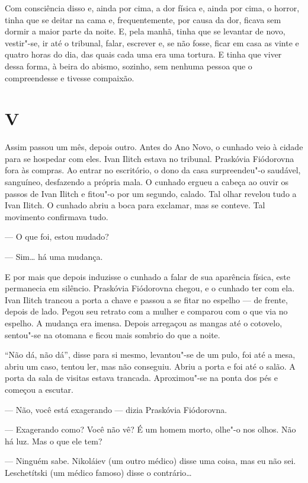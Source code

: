 Com consciência disso e, ainda por cima, a dor física e, ainda por cima,
o horror, tinha que se deitar na cama e, frequentemente, por causa da
dor, ficava sem dormir a maior parte da noite. E, pela manhã, tinha que
se levantar de novo, vestir"-se, ir até o tribunal, falar, escrever e, se
não fosse, ficar em casa as vinte e quatro horas do dia, das quais cada
uma era uma tortura. E tinha que viver dessa forma, à beira do abismo,
sozinho, sem nenhuma pessoa que o compreendesse e tivesse compaixão.

\section*{V}

Assim passou um mês, depois outro. Antes do Ano Novo, o cunhado veio à
cidade para se hospedar com eles. Ivan Ilitch estava no tribunal.
Praskóvia Fiódorovna fora às compras. Ao entrar no escritório, o dono da
casa surpreendeu"-o saudável, sanguíneo, desfazendo a própria mala. O
cunhado ergueu a cabeça ao ouvir os passos de Ivan Ilitch e fitou"-o por
um segundo, calado. Tal olhar revelou tudo a Ivan Ilitch. O cunhado
abriu a boca para exclamar, mas se conteve. Tal movimento confirmava
tudo.

--- O que foi, estou mudado?

--- Sim\ldots{} há uma mudança.

E por mais que depois induzisse o cunhado a falar de sua aparência
física, este permanecia em silêncio. Praskóvia Fiódorovna chegou, e o
cunhado ter com ela. Ivan Ilitch trancou a porta a chave e passou a se
fitar no espelho --- de frente, depois de lado. Pegou seu retrato com a
mulher e comparou com o que via no espelho. A mudança era imensa. Depois
arregaçou as mangas até o cotovelo, sentou"-se na otomana e ficou mais
sombrio do que a noite.

``Não dá, não dá'', disse para si mesmo, levantou"-se de um pulo, foi até
a mesa, abriu um caso, tentou ler, mas não conseguiu. Abriu a porta e
foi até o salão. A porta da sala de visitas estava trancada.
Aproximou"-se na ponta dos pés e começou a escutar.

--- Não, você está exagerando --- dizia Praskóvia Fiódorovna.

--- Exagerando como? Você não vê? É um homem morto, olhe"-o nos olhos. Não
há luz. Mas o que ele tem?

--- Ninguém sabe. Nikoláiev (um outro médico) disse uma coisa, mas eu não
sei. Leschetítski (um médico famoso) disse o contrário\ldots{}

